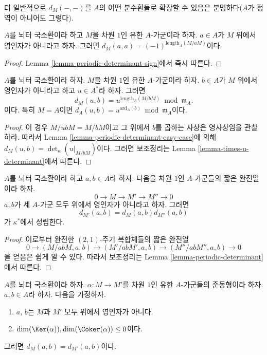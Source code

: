 \noindent
더 일반적으로 $d_M(-, -)$를 $A$의 어떤 분수환들로 확장할 수 있음은
분명하다($A$가 정역이 아니어도 그렇다).

\begin{lemma}
\label{lemma-symbol-when-equal}
$A$를 뇌터 국소환이라 하고 $M$을 차원 $1$인 유한 $A$-가군이라
하자. $a \in A$가 $M$ 위에서 영인자가 아니라고 하자. 그러면
$d_M(a, a) = (-1)^{\text{length}_A(M/aM)}$이다.
\end{lemma}

\begin{proof}
Lemma \ref{lemma-periodic-determinant-sign}에서 즉시 따른다.
\end{proof}

\begin{lemma}
\label{lemma-symbol-when-one-is-a-unit}
$A$를 뇌터 국소환이라 하자. $M$을 차원 $1$인 유한 $A$-가군이라
하자. $b \in A$가 $M$ 위에서 영인자가 아니라고 하고 $u \in A^*$라
하자. 그러면
$$
d_M(u, b) = u^{\text{length}_A(M/bM)} \bmod \mathfrak m_A.
$$
이다. 특히 $M = A$이면
$d_A(u, b) = u^{\text{ord}_A(b)} \bmod \mathfrak m_A$이다.
\end{lemma}

\begin{proof}
이 경우 $M/ubM = M/bM$이고 그 위에서 $b$를 곱하는 사상은
영사상임을 관찰하라. 따라서 Lemma
\ref{lemma-periodic-determinant-easy-case}에 의해
$d_M(u, b) = \det_\kappa(u|_{M/bM})$이다. 그러면 보조정리는 Lemma
\ref{lemma-times-u-determinant}에서 따른다.
\end{proof}

\begin{lemma}
\label{lemma-symbol-short-exact-sequence}
$A$를 뇌터 국소환이라 하고 $a, b \in A$라 하자. 다음을 차원 $1$인
$A$-가군들의 짧은 완전열이라 하자.
$$
0 \to M \to M' \to M'' \to 0
$$
$a, b$가 세 $A$-가군 모두 위에서 영인자가 아니라고 하자. 그러면
$$
d_{M'}(a, b) = d_M(a, b) d_{M''}(a, b)
$$
가 $\kappa^*$에서 성립한다.
\end{lemma}

\begin{proof}
이로부터 완전한 $(2, 1)$-주기 복합체들의 짧은 완전열
$$
0 \to
(M/abM, a, b) \to
(M'/abM', a, b) \to
(M''/abM'', a, b) \to 0
$$
을 얻음은 쉽게 알 수 있다. 따라서 보조정리는 Lemma
\ref{lemma-periodic-determinant}에서 따른다.
\end{proof}

\begin{lemma}
\label{lemma-symbol-compare-modules}
$A$를 뇌터 국소환이라 하자. $\alpha : M \to M'$를 차원 $1$인
유한 $A$-가군들의 준동형이라 하자. $a, b \in A$라 하자. 다음을
가정하자.
\begin{enumerate}
\item $a$, $b$는 $M$과 $M'$ 모두 위에서 영인자가 아니다.
\item $\dim(\Ker(\alpha)), \dim(\Coker(\alpha)) \leq 0$이다.
\end{enumerate}
그러면 $d_M(a, b) = d_{M'}(a, b)$이다.
\end{lemma}

